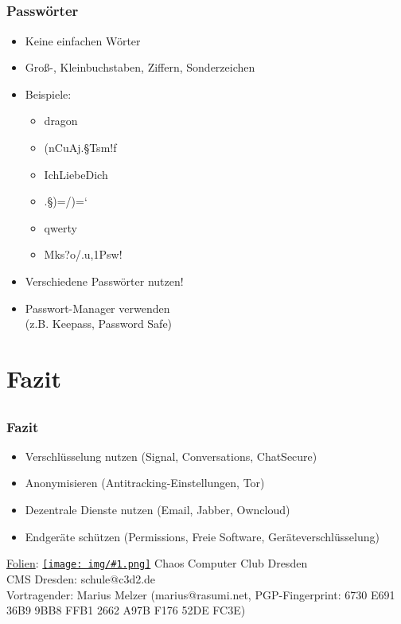 \documentclass[12pt, xcolor={svgnames,table}]{beamer}
\newcommand{\cc}[1]{\texttt{[image: img/\#1.png]}\hspace{1mm}}
\begin{document}
\subsection{}

\begin{frame}
    \frametitle{Passwörter}
    \begin{itemize}
        \item<2-> Keine einfachen Wörter
        \item<3-> Groß-, Kleinbuchstaben, Ziffern, Sonderzeichen
        \item<4-> Beispiele:
            \begin{itemize}
                \item<5-> dragon
                \item<6-> (nCuAj.§Tsm!f
                \item<7-> IchLiebeDich
                \item<8-> .§)=/)=`
                \item<9-> qwerty
                \item<10-> Mks?o/.u,1Psw!
            \end{itemize}
        \item<12-> Verschiedene Passwörter nutzen!
        \item<13-> Passwort-Manager verwenden \\ (z.B. Keepass, Password Safe)
    \end{itemize}
\end{frame}

\section{Fazit}
\subsection{}

\begin{frame}
  \frametitle{Fazit}
  \begin{center}
    \begin{itemize}
      \item Verschlüsselung nutzen (Signal, Conversations, ChatSecure)
      \item Anonymisieren (Antitracking-Einstellungen, Tor)
      \item Dezentrale Dienste nutzen (Email, Jabber, Owncloud)
      \item Endgeräte schützen (Permissions, Freie Software, Geräteverschlüsselung)
    \end{itemize}

    \vspace{5mm}
    \href{https://github.com/c3d2/cms}{Folien}: \href{https://creativecommons.org/licenses/by-sa/4.0/}{\cc{by-sa}} Chaos Computer Club Dresden \\
    \vspace{3mm}
    CMS Dresden: schule@c3d2.de\\
    Vortragender: Marius Melzer (marius@rasumi.net, PGP-Fingerprint: 6730 E691 36B9 9BB8 FFB1 2662 A97B F176 52DE FC3E)
  \end{center}
\end{frame}
\end{document}

